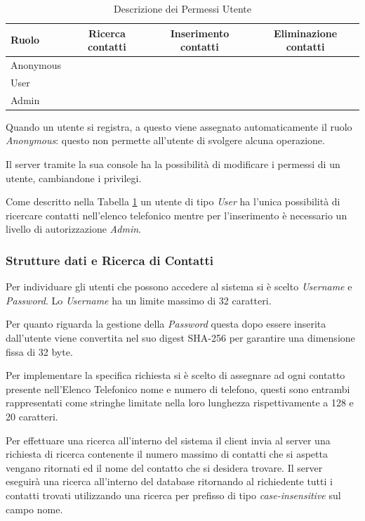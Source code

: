 \documentclass[11pt, a4paper]{article}
\newcommand{\cmark}{\ding{51}}
\newcommand{\xmark}{\ding{55}}
\begin{document}
	\begin{table}[htbp]
		\centering
		\begin{tabular}{lccc}
			\toprule
			\textbf{Ruolo} & \textbf{Ricerca contatti} & \textbf{Inserimento contatti} & \textbf{Eliminazione contatti} \\
			\midrule
			Anonymous & \xmark           & \xmark              & \xmark                \\
			User      & \cmark           & \xmark              & \xmark                \\
			Admin     & \cmark           & \cmark              & \cmark                \\
			\bottomrule
		\end{tabular}
		\caption{Descrizione dei Permessi Utente}
		\label{tab:permessi_utente}
	\end{table}
	
	Quando un utente si registra, a questo viene assegnato automaticamente il ruolo \textit{Anonymous}: questo non permette all'utente di svolgere alcuna operazione.
	
	Il server tramite la sua console ha la possibilità di modificare i permessi di un utente, cambiandone i privilegi.
	
	Come descritto nella Tabella \ref{tab:permessi_utente} un utente di tipo \textit{User} ha l'unica possibilità di ricercare contatti nell'elenco telefonico mentre per l'inserimento è necessario un livello di autorizzazione \textit{Admin}.
	
	\subsubsection{Strutture dati e Ricerca di Contatti}
	
	Per individuare gli utenti che possono accedere al sistema si è scelto \textit{Username} e \textit{Password}. Lo \textit{Username} ha un limite massimo di 32 caratteri.
	
	Per quanto riguarda la gestione della \textit{Password} questa dopo essere inserita dall'utente viene convertita nel suo digest SHA-256 per garantire una dimensione fissa di 32 byte.
	
	Per implementare la specifica richiesta si è scelto di assegnare ad ogni contatto presente nell'Elenco Telefonico nome e numero di telefono, questi sono entrambi rappresentati come stringhe limitate nella loro lunghezza rispettivamente a 128 e 20 caratteri.
	
	Per effettuare una ricerca all'interno del sistema il client invia al server una richiesta di ricerca contenente il numero massimo di contatti che si aspetta vengano ritornati ed il nome del contatto che si desidera trovare. Il server eseguirà una ricerca all'interno del database ritornando al richiedente tutti i contatti trovati utilizzando una ricerca per prefisso di tipo \textit{case-insensitive} sul campo nome.
	
\end{document}
